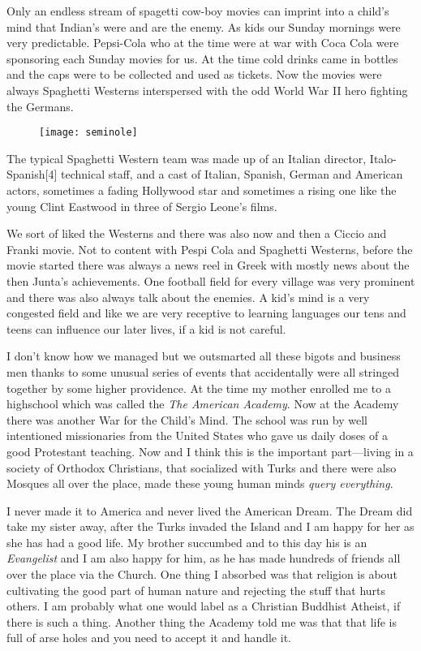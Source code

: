 \lettrine{O}{}nly an endless stream of spagetti cow-boy movies can imprint into a child’s mind that Indian’s
were and are the enemy. As kids our Sunday mornings were very predictable. Pepsi-Cola who at the time were
at war with Coca Cola were sponsoring each Sunday movies for us. At the time cold drinks came in bottles and the 
caps were to be collected and used as tickets. Now the movies were always Spaghetti Westerns interspersed with
the odd World War II hero fighting the Germans. 
\begin{figure}[ht]
\centering
\texttt{[image: seminole]}
\end{figure}
The typical Spaghetti Western team was made up of an Italian director, Italo-Spanish[4] technical staff, and a cast of Italian, Spanish, German and American actors, sometimes a fading Hollywood star and sometimes a rising one like the young Clint Eastwood in three of Sergio Leone's films.

We sort of liked the Westerns and there was also now and then a Ciccio and Franki movie. Not to content with Pespi Cola and Spaghetti Westerns, before the movie started there was always a news reel in Greek with mostly 
news about the then Junta’s achievements. One football field for every village was very prominent and there was
also always talk about the enemies. A kid’s mind is a very congested field and like we are very receptive to learning languages our tens and teens can influence our later lives, if a kid is not careful.

I don’t know how we managed but we outsmarted all these bigots and business men thanks to some unusual series of events that accidentally were all stringed together by some higher providence. At the time my mother
enrolled me to a highschool which was called the \emph{The American Academy}. Now at the Academy there
was another War for the Child’s Mind. The school was run by well intentioned missionaries from the United States
who gave us daily doses of a good Protestant teaching. Now and I think this is the important part---living in a society of Orthodox Christians, that socialized with Turks and there were also Mosques all over the place, made these young human minds \emph{query everything}. 

I never made it to America and never lived the American Dream. The Dream did take my sister away, after the Turks invaded the Island and I am happy for her as she has had a good life. My brother succumbed and to this day his is an \emph{Evangelist} and I am also happy for him, as he has made hundreds of friends all over the place via the Church. One thing I absorbed was that religion is about cultivating the good part of human nature and rejecting the stuff that hurts others. I am probably what one would label as a Christian Buddhist Atheist, if there is such a 
thing. Another thing the Academy told me was that that life is full of arse holes and you need to accept it and handle it. 

